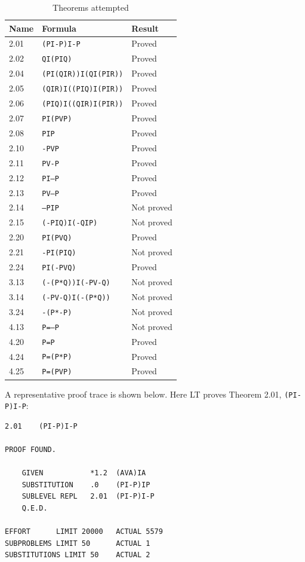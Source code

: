 \documentclass[journal]{IEEEtran}
\begin{document}
\begin{table}[h]
\centering
\caption{Theorems attempted}
\label{tab:results}
\begin{tabular}{lll}
\toprule
\textbf{Name} & \textbf{Formula} & \textbf{Result} \\
\midrule
2.01 & \texttt{(PI-P)I-P} & Proved \\
2.02 & \texttt{QI(PIQ)} & Proved \\
2.04 & \texttt{(PI(QIR))I(QI(PIR))} & Proved \\
2.05 & \texttt{(QIR)I((PIQ)I(PIR))} & Proved \\
2.06 & \texttt{(PIQ)I((QIR)I(PIR))} & Proved \\
2.07 & \texttt{PI(PVP)} & Proved \\
2.08 & \texttt{PIP} & Proved \\
2.10 & \texttt{-PVP} & Proved \\
2.11 & \texttt{PV-P} & Proved \\
2.12 & \texttt{PI--P} & Proved \\
2.13 & \texttt{PV---P} & Proved \\
2.14 & \texttt{--PIP} & Not proved \\
2.15 & \texttt{(-PIQ)I(-QIP)} & Not proved \\
2.20 & \texttt{PI(PVQ)} & Proved \\
2.21 & \texttt{-PI(PIQ)} & Not proved \\
2.24 & \texttt{PI(-PVQ)} & Proved \\
3.13 & \texttt{(-(P*Q))I(-PV-Q)} & Not proved \\
3.14 & \texttt{(-PV-Q)I(-(P*Q))} & Not proved \\
3.24 & \texttt{-(P*-P)} & Not proved \\
4.13 & \texttt{P=--P} & Not proved \\
4.20 & \texttt{P=P} & Proved \\
4.24 & \texttt{P=(P*P)} & Proved \\
4.25 & \texttt{P=(PVP)} & Proved \\
\bottomrule
\end{tabular}
\end{table}

A representative proof trace is shown below. Here LT proves Theorem
2.01, \texttt{(PI-P)I-P}:

\begin{lstlisting}
2.01    (PI-P)I-P

PROOF FOUND.

    GIVEN           *1.2  (AVA)IA
    SUBSTITUTION    .0    (PI-P)IP
    SUBLEVEL REPL   2.01  (PI-P)I-P
    Q.E.D.

EFFORT      LIMIT 20000   ACTUAL 5579
SUBPROBLEMS LIMIT 50      ACTUAL 1
SUBSTITUTIONS LIMIT 50    ACTUAL 2
\end{lstlisting}
\end{document}
